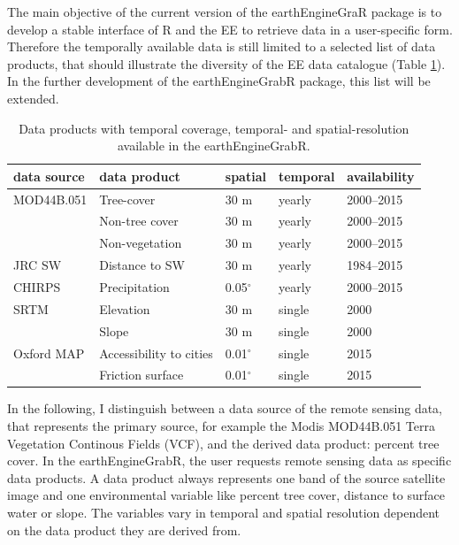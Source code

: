The main objective of the current version of the earthEngineGraR package is to develop a stable interface of R and the EE to retrieve data in a user-specific form. Therefore the temporally available data is still limited to a selected list of data products, that should illustrate the diversity of the EE data catalogue (Table \ref{data}). In the further development of the earthEngineGrabR package, this list will be extended.

\begin{table}[h]
		\caption{Data products with temporal coverage, temporal- and spatial-resolution available in the earthEngineGrabR.}
	\begin{tabularx}{\textwidth}{llXXX}
		\toprule
		\textbf{data source} & \textbf{data product} & \textbf{spatial} & \textbf{temporal} & \textbf{availability}\\
		\midrule
		
		MOD44B.051 & Tree-cover  & 30 m & yearly & 2000–2015 \\
		
		& Non-tree cover  & 30 m & yearly & 2000–2015 \\
		
		& Non-vegetation  & 30 m & yearly & 2000–2015 \\
		
		JRC SW  & Distance to SW & 30 m & yearly & 1984–2015 \\
		
		CHIRPS & Precipitation & 0.05$^\circ$ & yearly & 2000–2015\\
		
		SRTM & Elevation  & 30 m & single & 2000\\
		& Slope  & 30 m & single & 2000\\
		
		Oxford MAP & Accessibility to cities  & 0.01$^\circ$ & single & 2015\\
		
		& Friction surface  & 0.01$^\circ$  & single & 2015\\
		
		\bottomrule
	\end{tabularx}

	\label{data}
\end{table}

In the following, I distinguish between a data source of the remote sensing data, that represents the primary source, for example the Modis MOD44B.051 Terra Vegetation Continous Fields (VCF), and the derived data product: percent tree cover. In the earthEngineGrabR, the user requests remote sensing data as specific data products. A data product always represents one band of the source satellite image and one environmental variable like percent tree cover, distance to surface water or slope.
The variables vary in temporal and spatial resolution dependent on the data product they are derived from. 

